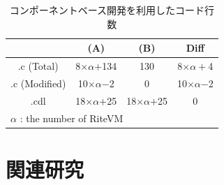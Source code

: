 \documentclass[submit,techrep]{ipsj}
\begin{document}
\begin{table}[t]
    \centering
    \caption{コンポーネントベース開発を利用したコード行数} 
    \begin{tabular}{c||cc|c}
                & (A)       & (B)     & Diff  \\ \hline
        .c (Total)      & 8$\times$$\alpha$$+$134  & 130     & 8$\times$$\alpha+$4\\
        .c (Modified)   & 10$\times\alpha$$-$2 & 0   &  10$\times\alpha$$-$2 \\
        .cdl    & 18$\times$$\alpha$$+$25   & 18$\times$$\alpha$$+$25 & 0     \\
        \multicolumn{3}{l}{{\small $\alpha$} : {\scriptsize the number of RiteVM}}
    \end{tabular}
    \label{tab:codesize}
\end{table}

\section{関連研究}
\label{sec:Related Work}
\end{document}
